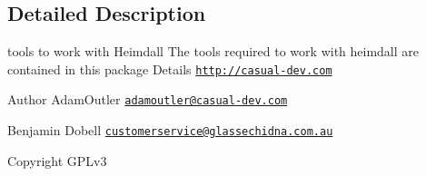 \subsection{Detailed Description}
tools to work with Heimdall The tools required to work with heimdall are contained in this package Details \href{http://casual-dev.com}{\tt http\-://casual-\/dev.\-com} \begin{DoxyAuthor}{Author}
Adam\-Outler \href{mailto:adamoutler@casual-dev.com}{\tt adamoutler@casual-\/dev.\-com} 

Benjamin Dobell \href{mailto:customerservice@glassechidna.com.au}{\tt customerservice@glassechidna.\-com.\-au} 
\end{DoxyAuthor}
\begin{DoxyCopyright}{Copyright}
G\-P\-Lv3 
\end{DoxyCopyright}
